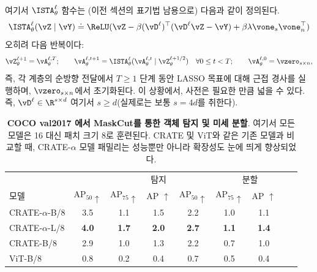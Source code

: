 \documentclass[../../book-main_ko.tex]{subfiles}
\begin{document}
여기서 \(\ISTA_{\theta}^{\ell}\) 함수는 (이전 섹션의 표기법 남용으로) 다음과 같이 정의된다.
\begin{equation}
    \ISTA_{\theta}^{\ell}(\vZ \mid \vY) \doteq \ReLU(\vZ - \beta (\vD^{\ell})^{\top}(\vD^{\ell}\vZ - \vY) + \beta \lambda \vone_{s}\vone_{n}^{\top})
\end{equation}
오히려 다음 반복이다:
\begin{equation}
    \vZ_{\theta}^{\ell + 1} = \vA_{\theta}^{\ell, T}; \qquad \vA_{\theta}^{\ell, t + 1} = \ISTA_{\theta}^{\ell}(\vA_{\theta}^{\ell, t} \mid \vZ_{\theta}^{\ell + 1/2}) \quad \forall 0 \leq t < T; \qquad \vA_{\theta}^{\ell, 0} = \vzero_{s \times n},
\end{equation}
즉, 각 계층의 순방향 전달에서 \(T \geq 1\) 단계 동안 LASSO 목표에 대해 근접 경사를 실행하며, \(\vzero_{s \times n}\)에서 초기화된다. 이 상황에서, 사전은 필요한 만큼 넓을 수 있다. 즉, \(\vD^{\ell} \in \R^{s \times d}\) 여기서 \(s \geq d\)(실제로는 보통 \(s = 4d\)를 취한다).

\begin{table}[b]
    \centering
    \begin{tabular}{@{}lcccccccc@{}}
    \toprule
     &  & \multicolumn{3}{c}{탐지} &  \multicolumn{3}{c}{분할} \\
    모델 & AP$_{50} \uparrow $ & AP$_{75} \uparrow $ & AP $\uparrow$ & AP$_{50} \uparrow$ & AP$_{75} \uparrow $ & AP $\uparrow$ \\
    \midrule
    \midrule
    CRATE-\( \alpha \)-B/8 & 3.5 & 1.1 & 1.5 & 2.2 & 1.0 & 1.1 \\
    CRATE-\( \alpha \)-L/8 & \textbf{4.0} & \textbf{1.7} & \textbf{2.0} & \textbf{2.7} & \textbf{1.1} & \textbf{1.4} \\
    \midrule
    \color{gray}CRATE-B/8 & \color{gray}2.9 & \color{gray}1.0 & \color{gray}1.3 & \color{gray}2.2 & \color{gray}0.7 & \color{gray}1.0 \\
    \color{gray}ViT-B/8 & \color{gray}0.8 & \color{gray}0.2 & \color{gray}0.4 & \color{gray}0.7 & \color{gray}0.5 & \color{gray}0.4 \\
    \bottomrule
    \end{tabular}
    \caption{\small \textbf{COCO val2017 \citep{lin2014microsoft}에서 MaskCut를 통한 객체 탐지 및 미세 분할}. 여기서 모든 모델은 16 대신 패치 크기 8로 훈련된다. CRATE 및 ViT와 같은 기존 모델과 비교할 때, CRATE-\( \alpha \) 모델 패밀리는 성능뿐만 아니라 확장성도 눈에 띄게 향상되었다.}
    \label{tab:crate_alpha_detection_segmentation}
\end{table}
\end{document}
